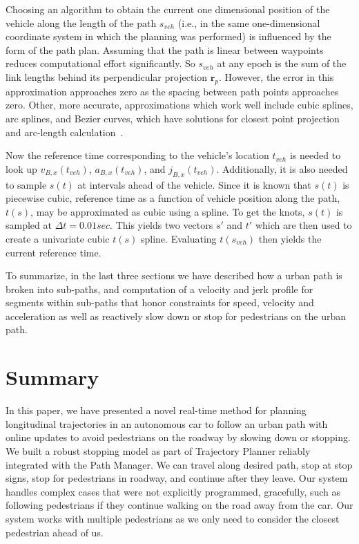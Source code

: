 \documentclass[letterpaper, 10 pt, conference]{ieeeconf}  %
\begin{document}
Choosing an algorithm to obtain the current one dimensional position of the vehicle along the length of the path $s_{veh}$ (i.e., in the same one-dimensional coordinate system in which the planning was performed) is influenced by the form of the path plan.
Assuming that the path is linear between waypoints reduces computational effort significantly.
So $s_{veh}$ at any epoch is the sum of the link lengths behind its perpendicular projection $\mathbf{r}_p$.
However, the error in this approximation approaches zero as the spacing between path points approaches zero.
Other, more accurate, approximations which work well include cubic splines, arc splines, and Bezier curves, which have solutions for closest point projection and arc-length calculation~\cite{Wang2002,Wang2003,Schindler2011}.

Now the reference time corresponding to the vehicle's location $t_{veh}$ is needed to look up $v_{B,x}(t_{veh})$, $a_{B,x}(t_{veh})$, and $j_{B,x}(t_{veh})$.
Additionally, it is also needed to sample $s(t)$ at intervals ahead of the vehicle.
Since it is known that $s(t)$ is piecewise cubic, reference time as a function of vehicle position along the path, $t(s)$, may be approximated as cubic using a spline.
To get the knots, $s(t)$ is sampled at $\Delta t = 0.01 sec$.
This yields two vectors $s'$ and $t'$ which are then used to create a univariate cubic $t(s)$ spline.
Evaluating $t(s_{veh})$ then yields the current reference time.


To summarize, in the last three sections we have described how a urban path is broken into sub-paths,
and computation of a velocity and jerk profile for segments within sub-paths that honor constraints
for speed, velocity and acceleration as well as reactively slow down or stop for pedestrians on
the urban path.

\section{Summary} \label{sec:summary}


In this paper, we have presented a novel real-time method for planning longitudinal trajectories 
in an autonomous car to follow an urban path with online updates to avoid pedestrians on the roadway by slowing down or 
stopping. We built a robust stopping model as part of Trajectory Planner reliably integrated with 
the Path Manager.
We can travel along desired path, stop at stop signs, stop for pedestrians in roadway, and continue after 
they leave. Our system handles complex cases that were not explicitly programmed, gracefully, such as following 
pedestrians if they continue walking on the road away from the car. Our system works with multiple 
pedestrians as we only need to consider the closest pedestrian ahead of us. 
\end{document}
